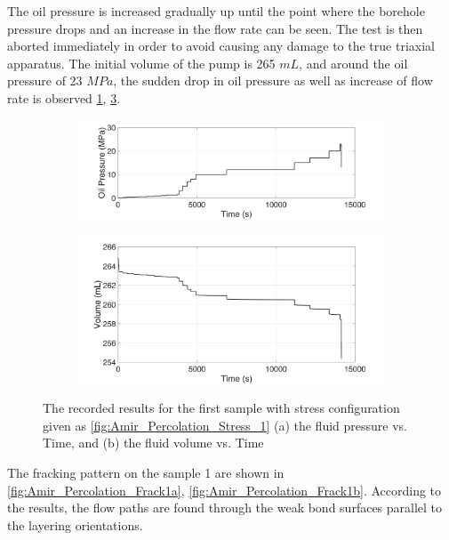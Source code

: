 The oil pressure is increased gradually up until the point where the borehole pressure drops and an increase in the flow rate can be seen. The test is then aborted immediately in order to avoid causing any damage to the true triaxial apparatus. The initial volume of the pump is 265 $mL$, and around the oil pressure of 23 $MPa$, the sudden drop in oil pressure as well as increase of flow rate is observed \ref{fig:Amir_Percolation_Time_Pressure1}, 
\ref{fig:Amir_Percolation_Time_Volume1}.


\begin{figure}[!ht]
\centering
\begin{subfigure}[b]{0.75\textwidth}
\includegraphics[width=1\linewidth]{figures/Amir_Percolation_Time_Pressure1.png}
\subcaption{}
\label{fig:Amir_Percolation_Time_Pressure1}
\end{subfigure}
\begin{subfigure}[b]{0.75\textwidth}
\includegraphics[width=1\linewidth]{figures/Amir_Percolation_Time_Volume1.png}
\subcaption{}
\label{fig:Amir_Percolation_Time_Volume1}
\end{subfigure}
\caption{The recorded results for the first sample with stress configuration given as \ref{fig:Amir_Percolation_Stress_1} (a) the fluid pressure vs. Time, and (b) the fluid volume vs. Time}
\end{figure}

The fracking pattern on the sample 1 are shown in \ref{fig:Amir_Percolation_Frack1a}, \ref{fig:Amir_Percolation_Frack1b}. According to the results, the flow paths are found through the weak bond surfaces parallel to the layering orientations. 


